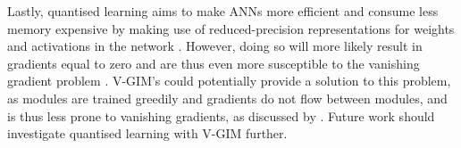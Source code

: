 		Lastly, quantised learning aims to make ANNs more efficient and consume less memory expensive by making use of reduced-precision representations for weights and activations in the network \cite{blottFINNREndtoEndDeepLearning2018}. However, doing so will more likely result in gradients equal to zero and are thus even more susceptible to the vanishing gradient problem \cite{kimDistanceawareQuantization2021}. V-GIM's could potentially provide a solution to this problem, as modules are trained greedily and gradients do not flow between modules, and is thus less prone to vanishing gradients, as discussed by \cite{lowePuttingEndEndtoEnd2020}. Future work should investigate quantised learning with V-GIM further.
		
		
		
		
		
		

		
		
		
		
		 
